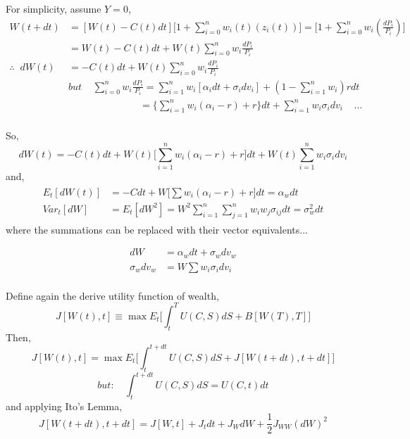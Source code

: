 \documentclass[
14pt,notheorems,hyperref={pdfauthor=whatever}
]{beamer}
\begin{document}
\begin{frame}
For simplicity, assume $Y=0$,\\
\begin{align*}
    W(t+dt) &= [W(t)-C(t)dt] \Bigg[1 + \sum_{i=0}^n w_i(t)(z_i(t)) \Bigg] = \Bigg[1 + \sum_{i=0}^n w_i(\frac{dP_i}{P_i}) \Bigg]\\
    &= W(t)-C(t)dt+W(t)\sum_{i=0}^n w_i\frac{dP_i}{P_i}\\
    \therefore \;\; dW(t) &= -C(t)dt + W(t)\sum_{i=0}^n w_i\frac{dP_i}{P_i}\\
    &\textit{but} \;\;\;\; \sum_{i=0}^n w_i\frac{dP_i}{P_i} = \sum_{i=1}^n w_i[\alpha_i dt + \sigma_i dv_i] + (1-\sum_{i=1}^n w_i)r dt\\
    &\;\;\;\;\;\;\;\;\;\;\;\;\;\;\;\;\;\;\;\;\;\;\;\;\;\; = \Bigg\{\sum_{i=1}^n w_i(\alpha_i-r) + r \Bigg\}dt + \sum_{i=1}^n w_i \sigma_i dv_i \;\;\;\; \textit{...}\\
\end{align*}
\end{frame}

\begin{frame}
So,
\begin{equation} \tag{4}
    dW(t) = -C(t)dt + W(t)\Bigg[\sum_{i=1}^n w_i(\alpha_i-r) + r\Bigg]dt +W(t)\sum_{i=1}^n w_i \sigma_i dv_i
\end{equation}
and,
\begin{align} \tag{5}
\begin{split}
    E_t[dW(t)] &= -Cdt + W\Bigg[\sum w_i(\alpha_i-r) + r\Bigg]dt = \alpha_w dt
    \\
    Var_t[dW] &= E_t[dW^2] = W^2 \sum_{i=1}^n \sum_{j=1}^n w_i w_j \sigma_{ij} dt = \sigma_w^2 dt 
\end{split}
\end{align}
where the summations can be replaced with their vector equivalents...
\end{frame}

\begin{frame}
\begin{align*}
    dW &= \alpha_w dt + \sigma_w dv_w\\
    \sigma_w dv_w &= W \sum w_i \sigma_i dv_i\\
\end{align*}
\end{frame}

\begin{frame}
Define again the derive utility function of wealth,
\begin{equation} \tag{6}
    J[W(t),t] \equiv \max E_t \Bigg[ \int_t^T U(C,S)dS + B[W(T),T] \Bigg]
\end{equation}
Then,
\begin{equation} \tag{7}
    J[W(t),t] = \max E_t \Bigg[ \int_t^{t+dt} U(C,S)dS + J[W(t+dt),t+dt] \Bigg]
\end{equation}
\[\textit{but:}\;\;\;\; \int_t^{t+dt} U(C,S)dS = U(C,t)dt\]
and applying Ito's Lemma,
\[ J[W(t+dt),t+dt] = J[W,t] + J_tdt + J_WdW + \frac{1}{2} J_{WW}(dW)^2\]
\end{frame}
\end{document}
